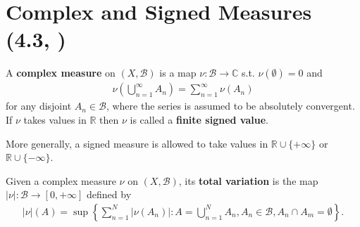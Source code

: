 \section{Complex and Signed Measures \tiny{(4.3, \cite{Gerald_Teschl})}}
\begin{definition}
    A \textbf{complex measure} on \(\left(X,\mathscr{B}\right)\) is a map \(\nu:\mathscr{B}\rightarrow \mathbb{C}\) s.t. 
    \(\nu(\emptyset)=0\) and
    \begin{align*}
        \nu\left(\bigcup\limits_{n=1}^{\infty}A_n\right) = \sum\limits_{n=1}^{\infty}\nu(A_n)
    \end{align*}
    for any disjoint \(A_n\in\mathscr{B}\), where the series is assumed to be absolutely convergent. If \(\nu\) takes values in \(\mathbb{R}\) then \(\nu\) is called a \textbf{finite signed value}.
\end{definition}
\begin{remark}
    More generally, a signed measure is allowed to take values in \(\mathbb{R}\cup\{+\infty\}\) or \(\mathbb{R}\cup\{-\infty\}\).
\end{remark}

    Given a complex measure \(\nu\) on \((X,\mathscr{B})\), its \textbf{total variation} is the map \(|\nu|:\mathscr{B}\rightarrow[0,+\infty]\) defined by
    \begin{align*}
        |\nu|(A) = \sup\left\{\sum\limits_{n=1}^{N}|\nu(A_n)|:A=\bigcup\limits_{n=1}^{N}A_n, A_n\in\mathscr{B}, A_n\cap A_m = \emptyset\right\}.
    \end{align*}

